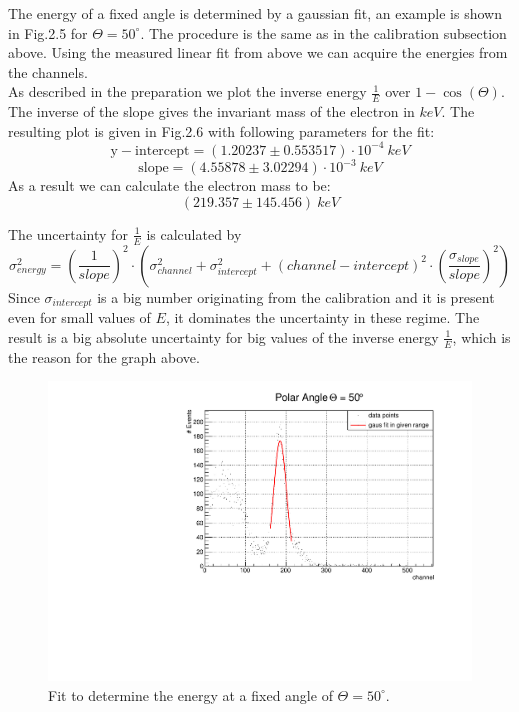 The energy of a fixed angle is determined by a gaussian fit, an example is shown in Fig.2.5 for $\Theta = 50^{\circ}$. The procedure is the same as in the calibration subsection above. Using the measured linear fit from above we can acquire the energies from the channels.\\
As described in the preparation we plot the inverse energy $\frac{1}{E}$ over $1 - \cos(\Theta)$. The inverse of the slope gives the invariant mass of the electron in $keV$. The resulting plot is given in Fig.2.6 with following parameters for the fit:
$$\mathrm{y-intercept} = (1.20237 \pm 0.553517) \cdot 10^{-4} \ keV$$
$$\mathrm{slope} =  (4.55878 \pm 3.02294) \cdot 10^{-3} \ keV$$
As a result we can calculate the electron mass to be:
$$(219.357 \pm 145.456) \ keV$$

The uncertainty for $\frac{1}{E}$ is calculated by 
$$\sigma _{energy}^{2} = (\frac{1}{slope})^{2} \cdot (\sigma _{channel} ^{2} + \sigma _{intercept} ^{2} + (channel - intercept)^{2} \cdot (\frac{\sigma_{slope}}{slope})^{2}) $$
Since $\sigma _{intercept}$ is a big number originating from the calibration and it is present even for small values of ${E}$, it dominates the uncertainty in these regime. The result is a big absolute uncertainty for big values of the inverse energy $\frac{1}{E}$, which is the reason for the graph above.

\begin{figure}[h]
\includegraphics[scale=0.5]{./../plots/50_deg.pdf}
\caption{Fit to determine the energy at a fixed angle of $\Theta = 50^{\circ}$.}
\end{figure}

\newpage

